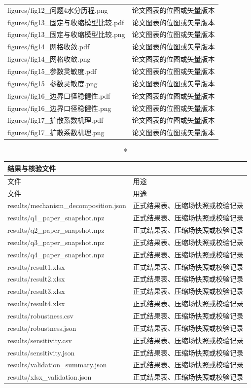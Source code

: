 \begin{longtable}{p{}p{}}
figures/fig12\_问题4水分历程.png & 论文图表的位图或矢量版本\\
figures/fig13\_固定与收缩模型比较.pdf & 论文图表的位图或矢量版本\\
figures/fig13\_固定与收缩模型比较.png & 论文图表的位图或矢量版本\\
figures/fig14\_网格收敛.pdf & 论文图表的位图或矢量版本\\
figures/fig14\_网格收敛.png & 论文图表的位图或矢量版本\\
figures/fig15\_参数灵敏度.pdf & 论文图表的位图或矢量版本\\
figures/fig15\_参数灵敏度.png & 论文图表的位图或矢量版本\\
figures/fig16\_边界口径稳健性.pdf & 论文图表的位图或矢量版本\\
figures/fig16\_边界口径稳健性.png & 论文图表的位图或矢量版本\\
figures/fig17\_扩散系数机理.pdf & 论文图表的位图或矢量版本\\
figures/fig17\_扩散系数机理.png & 论文图表的位图或矢量版本\\
\bottomrule
\end{longtable}

\begin{longtable}{p{}p{}}
\caption*{结果与核验文件}\\
\toprule 文件 & 用途\\
\midrule\endfirsthead
\toprule 文件 & 用途\\
\midrule\endhead
results/mechanism\_decomposition.json & 正式结果表、压缩场快照或校验记录\\
results/q1\_paper\_snapshot.npz & 正式结果表、压缩场快照或校验记录\\
results/q2\_paper\_snapshot.npz & 正式结果表、压缩场快照或校验记录\\
results/q3\_paper\_snapshot.npz & 正式结果表、压缩场快照或校验记录\\
results/q4\_paper\_snapshot.npz & 正式结果表、压缩场快照或校验记录\\
results/result1.xlsx & 正式结果表、压缩场快照或校验记录\\
results/result2.xlsx & 正式结果表、压缩场快照或校验记录\\
results/result3.xlsx & 正式结果表、压缩场快照或校验记录\\
results/result4.xlsx & 正式结果表、压缩场快照或校验记录\\
results/robustness.csv & 正式结果表、压缩场快照或校验记录\\
results/robustness.json & 正式结果表、压缩场快照或校验记录\\
results/sensitivity.csv & 正式结果表、压缩场快照或校验记录\\
results/sensitivity.json & 正式结果表、压缩场快照或校验记录\\
results/validation\_summary.json & 正式结果表、压缩场快照或校验记录\\
results/xlsx\_validation.json & 正式结果表、压缩场快照或校验记录\\
\bottomrule
\end{longtable}
